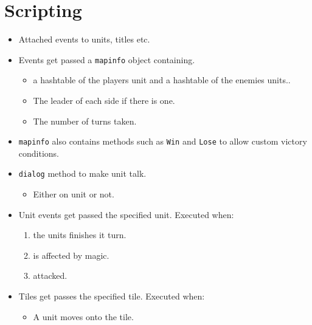 \section{Scripting}
\label{sec:Scripting}
\begin{itemize}


\item Attached events to units, titles etc.

\item Events get passed a \texttt{mapinfo} object containing.
\begin{itemize}
	\item a hashtable of the players unit and a hashtable of the enemies units..
	\item The leader of each side if there is one.
	\item The number of turns taken.
\end{itemize}

\item \texttt{mapinfo} also contains methods such as \texttt{Win} and \texttt{Lose} to allow custom victory conditions.

\item \texttt{dialog} method to make unit talk.
\begin{itemize}
	\item Either on unit or not.
\end{itemize}

\item Unit events get passed the specified unit. Executed when:
\begin{enumerate}
	\item the units finishes it turn.
	\item is affected by magic.
	\item attacked.
\end{enumerate}

\item Tiles get passes the specified tile. Executed when:
\begin{itemize}
	\item A unit moves onto the tile.
\end{itemize}

\end{itemize}

